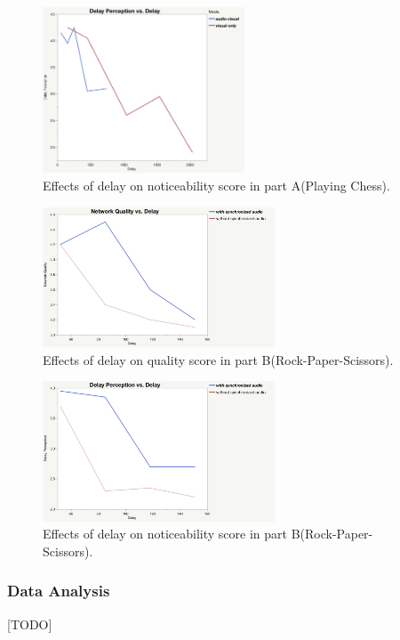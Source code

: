 \begin{figure}[H]
\centering
\includegraphics[width=6cm]{figures/figure_experiment1_DP.jpg}
\setlength{\abovecaptionskip}{0.5cm}
\caption{Effects of delay on noticeability score in part A(Playing Chess).}
\label{4}
\end{figure}

\begin{figure}[H]
\centering
\includegraphics[width=6.9cm]{figures/figure_experiment2_NQ.jpg}
\setlength{\abovecaptionskip}{0.5cm}
\caption{Effects of delay on quality score in part B(Rock-Paper-Scissors).}
\label{4}
\end{figure}

\begin{figure}[H]
\centering
\includegraphics[width=6.9cm]{figures/figure_experiment2_DP.jpg}
\setlength{\abovecaptionskip}{0.5cm}
\caption{Effects of delay on noticeability score in part B(Rock-Paper-Scissors).}
\label{4}
\end{figure}


\subsubsection{Data Analysis}[TODO]

